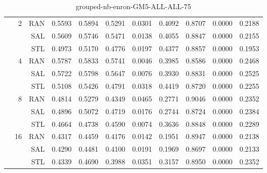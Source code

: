 \begin{center}
\begin{table}[htbp]
\begin{center}
\begin{tabular}{ | r | r | r | r | r | r | r | r | r | r | r |}
 & \multirow{3}{*}{2} & RAN & 0.5593 & 0.5894 & 0.5291 & 0.0301 & 0.4092 & 0.8707 & 0.0000 & 0.2188\\ \cline{3-11}
 &   & SAL & 0.5609 & 0.5746 & 0.5471 & 0.0138 & 0.4055 & 0.8847 & 0.0000 & 0.2155\\ \cline{3-11}
 &   & STL & 0.4973 & 0.5170 & 0.4776 & 0.0197 & 0.4377 & 0.8857 & 0.0000 & 0.1953\\ \cline{2-11}
 & \multirow{3}{*}{4} & RAN & 0.5787 & 0.5833 & 0.5741 & 0.0046 & 0.3985 & 0.8586 & 0.0000 & 0.2468\\ \cline{3-11}
 &   & SAL & 0.5722 & 0.5798 & 0.5647 & 0.0076 & 0.3930 & 0.8831 & 0.0000 & 0.2525\\ \cline{3-11}
 &   & STL & 0.5108 & 0.5426 & 0.4791 & 0.0318 & 0.4419 & 0.8720 & 0.0000 & 0.2255\\ \cline{2-11}
 & \multirow{3}{*}{8} & RAN & 0.4814 & 0.5279 & 0.4349 & 0.0465 & 0.2771 & 0.9046 & 0.0000 & 0.2352\\ \cline{3-11}
 &   & SAL & 0.4896 & 0.5072 & 0.4719 & 0.0176 & 0.2744 & 0.8724 & 0.0000 & 0.2384\\ \cline{3-11}
 &   & STL & 0.4664 & 0.4738 & 0.4590 & 0.0074 & 0.3636 & 0.8848 & 0.0000 & 0.2289\\ \cline{2-11}
 & \multirow{3}{*}{16} & RAN & 0.4317 & 0.4459 & 0.4176 & 0.0142 & 0.1951 & 0.8947 & 0.0000 & 0.2138\\ \cline{3-11}
 &   & SAL & 0.4290 & 0.4481 & 0.4100 & 0.0191 & 0.1969 & 0.8697 & 0.0000 & 0.2133\\ \cline{3-11}
 &   & STL & 0.4339 & 0.4690 & 0.3988 & 0.0351 & 0.3157 & 0.8950 & 0.0000 & 0.2352\\ \cline{2-11}
\hline
\end{tabular}
\caption{grouped-nb-enron-GM5-ALL-ALL-75}
\end{center}
 \end{table}
\end{center}

